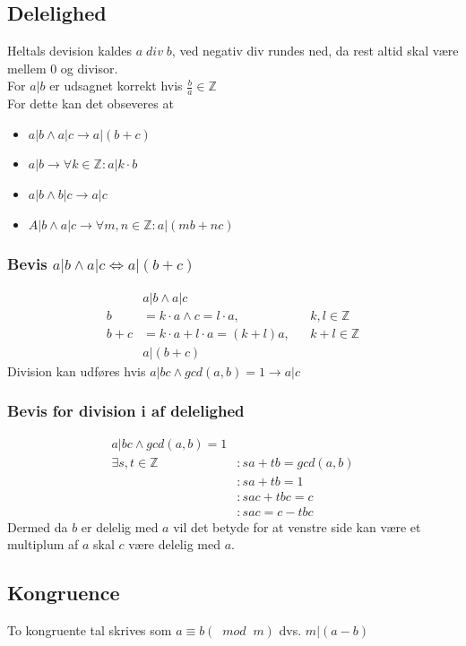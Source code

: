 \documentclass[12pt, a4paper]{article}
\begin{document}
			\subsection{Delelighed}
				Heltals devision kaldes $a\; div\; b$, ved negativ div rundes ned, da rest altid  skal være mellem 0 og divisor.\\
				For $a|b$ er udsagnet korrekt hvis $\frac{b}{a}\in\mathbb{Z}$\\
				For dette kan det obseveres at 
				\begin{itemize}
					\item $a|b \land a|c \rightarrow a|(b+c)$
					\item $a|b\rightarrow \forall k \in \mathbb{Z} : a|k\cdot b$
					\item $a|b\land b|c \rightarrow a|c$
					\item $A|b\land a|c \rightarrow \forall m,n \in \mathbb{Z}: a|(mb+nc)$
				\end{itemize}
				\subsubsection{Bevis $a|b\land a|c \iff a|(b+c)$}
					\begin{align*}
						&a|b\land a|c\\
						b&=k\cdot a \land c=l\cdot a,&&k,l\in\mathbb{Z}\\
						b+c&=k\cdot a + l\cdot a = (k+l)a, && k+l\in \mathbb{Z}\\
						&a|(b+c)
					\end{align*}
				Division kan udføres hvis $a|bc \land gcd(a,b)=1 \rightarrow a|c$\\
				\subsubsection{Bevis for division i af delelighed}
					\begin{align*}
						a|bc \land gcd(a,b)=1\\
						\exists s,t \in \mathbb{Z}&: sa+tb=gcd(a,b)\\
									  &: sa+tb=1\\
									  &: sac+tbc=c\\
									  &: sac=c-tbc
					\end{align*}
					Dermed da $b$ er delelig med $a$ vil det betyde for at venstre side kan være et multiplum af $a$ skal $c$ være delelig med $a$. 
				
			\subsection{Kongruence}
				To kongruente tal skrives som $a\equiv b (\; \; mod \; \; m)$ dvs. $m|(a-b)$\\
\end{document}
